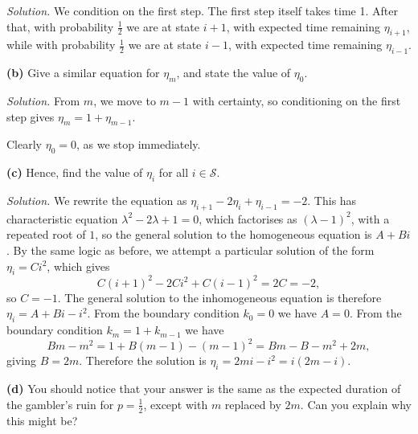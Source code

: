 \documentclass[
  a4paper,
]{article}
\theoremstyle{definition}
\theoremstyle{definition}
\theoremstyle{definition}
\theoremstyle{remark}
\begin{document}
\begin{myanswers}
\emph{Solution.} We condition on the first step. The first step itself takes time 1. After that, with probability \(\frac12\) we are at state \(i+1\), with expected time remaining \(\eta_{i+1}\), while with probability \(\frac12\) we are at state \(i-1\), with expected time remaining \(\eta_{i-1}\).

\end{myanswers}

\textbf{(b)} Give a similar equation for \(\eta_m\), and state the value of \(\eta_0\).

\begin{myanswers}
\emph{Solution.} From \(m\), we move to \(m-1\) with certainty, so conditioning on the first step gives \(\eta_m = 1 + \eta_{m-1}\).

Clearly \(\eta_0 = 0\), as we stop immediately.

\end{myanswers}

\textbf{(c)} Hence, find the value of \(\eta_i\) for all \(i \in \mathcal S\).

\begin{myanswers}
\emph{Solution.} We rewrite the equation as \(\eta_{i+1} - 2 \eta_i + \eta_{i-1} = -2\). This has characteristic equation \(\lambda^2 - 2\lambda + 1 = 0\), which factorises as \((\lambda-1)^2\), with a repeated root of \(1\), so the general solution to the homogeneous equation is \(A + Bi\). By the same logic as before, we attempt a particular solution of the form \(\eta_i = Ci^2\), which gives
\[ C(i+1)^2 - 2Ci^2 + C(i-1)^2 = 2C = -2 ,   \]
so \(C = -1\). The general solution to the inhomogeneous equation is therefore \(\eta_i = A + Bi - i^2\). From the boundary condition \(k_0 = 0\) we have \(A = 0\). From the boundary condition \(k_m = 1 + k_{m-1}\) we have
\[ Bm - m^2 = 1 + B(m-1) - (m-1)^2 = Bm - B - m^2 +2m  , \]
giving \(B = 2m\). Therefore the solution is \(\eta_i = 2mi - i^2 = i(2m - i)\).

\end{myanswers}

\textbf{(d)} You should notice that your answer is the same as the expected duration of the gambler's ruin for \(p = \frac12\), except with \(m\) replaced by \(2m\). Can you explain why this might be?
\end{document}

